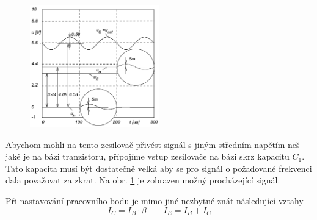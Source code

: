 \documentclass{article}
\newcommand \obr[1]
{ obr. \ref{#1}}
\begin{document}
\vspace{1mm}
\begin{figure}
  \vspace{-10mm}
  \includegraphics[width=0.5\textwidth]{vstup-baze-vystup.png}
  \caption{\label{vstup_baze_vystup}}
\end{figure}
Abychom mohli na tento zesilovač přivést signál s jiným středním napětím neš jaké je na bázi tranzistoru, přípojíme vstup zesilovače na bázi skrz kapacitu \(C_1\).
Tato kapacita musí být dostatečně velká aby se pro signál o požadované frekvenci dala považovat za zkrat.
Na \obr{vstup_baze_vystup} je zobrazen možný procházející signál.

Při nastavování pracovního bodu je mimo jiné nezbytné znát následující vztahy
\begin{equation}
    I_C=I_B\cdot\beta \quad \quad I_{E}=I_{B}+I_{C}
    \label{proud_kolektoru}
\end{equation}
\newpage
\end{document}

